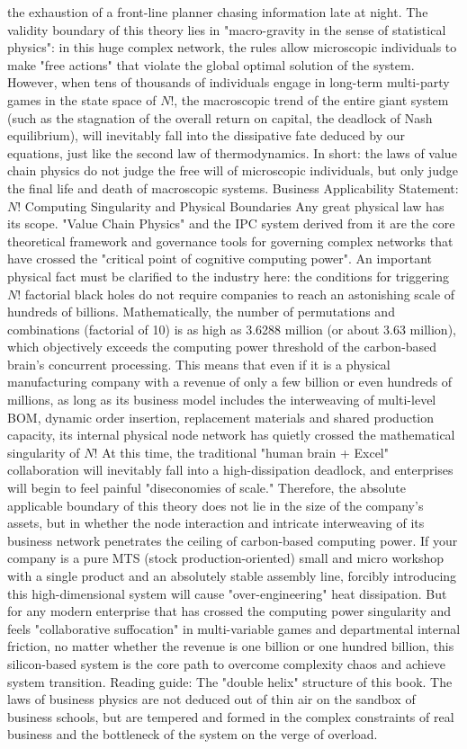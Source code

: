 \documentclass[11pt,a4paper]{article}
\begin{document}
the exhaustion of a front-line planner chasing information late at night. The validity boundary of this theory lies in "macro-gravity in the sense of statistical physics": in this huge complex network, the rules allow microscopic individuals to make "free actions" that violate the global optimal solution of the system. However, when tens of thousands of individuals engage in long-term multi-party games in the state space of $N!$, the macroscopic trend of the entire giant system (such as the stagnation of the overall return on capital, the deadlock of Nash equilibrium), will inevitably fall into the dissipative fate deduced by our equations, just like the second law of thermodynamics. In short: the laws of value chain physics do not judge the free will of microscopic individuals, but only judge the final life and death of macroscopic systems. Business Applicability Statement: $N!$ Computing Singularity and Physical Boundaries Any great physical law has its scope. "Value Chain Physics" and the IPC system derived from it are the core theoretical framework and governance tools for governing complex networks that have crossed the "critical point of cognitive computing power". An important physical fact must be clarified to the industry here: the conditions for triggering $N!$ factorial black holes do not require companies to reach an astonishing scale of hundreds of billions. Mathematically, the number of permutations and combinations (factorial of 10) is as high as 3.6288 million (or about 3.63 million), which objectively exceeds the computing power threshold of the carbon-based brain’s concurrent processing. This means that even if it is a physical manufacturing company with a revenue of only a few billion or even hundreds of millions, as long as its business model includes the interweaving of multi-level BOM, dynamic order insertion, replacement materials and shared production capacity, its internal physical node network has quietly crossed the mathematical singularity of $N!$ At this time, the traditional "human brain + Excel" collaboration will inevitably fall into a high-dissipation deadlock, and enterprises will begin to feel painful "diseconomies of scale." Therefore, the absolute applicable boundary of this theory does not lie in the size of the company's assets, but in whether the node interaction and intricate interweaving of its business network penetrates the ceiling of carbon-based computing power. If your company is a pure MTS (stock production-oriented) small and micro workshop with a single product and an absolutely stable assembly line, forcibly introducing this high-dimensional system will cause "over-engineering" heat dissipation. But for any modern enterprise that has crossed the computing power singularity and feels "collaborative suffocation" in multi-variable games and departmental internal friction, no matter whether the revenue is one billion or one hundred billion, this silicon-based system is the core path to overcome complexity chaos and achieve system transition. Reading guide: The "double helix" structure of this book. The laws of business physics are not deduced out of thin air on the sandbox of business schools, but are tempered and formed in the complex constraints of real business and the bottleneck of the system on the verge of overload. 
\end{document}
